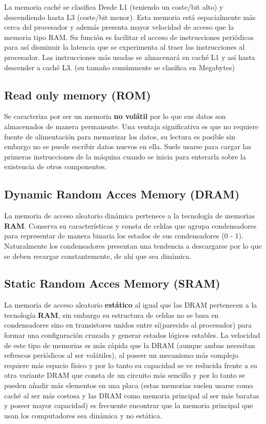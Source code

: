 \documentclass{article}
\begin{document}
La memoria caché se clasifica Desde L1 (teniendo un coste/bit alto) y descendiendo hasta L3 (coste/bit menor). Esta memoria está espacialmente más cerca del procesador y además presenta mayor velocidad de acceso que la memoria tipo RAM. Su función es facilitar el acceso de instrucciones 
 periódicas 
 para así disminuir la latencia que se experimenta al traer las instrucciones al procesador. Las instrucciones más usadas se almacenará en caché L1 y así hasta descender a caché L3.
(su tamaño comúnmente se clasifica en Megabytes)


\subsection{Read only memory (ROM)}
Se caracteriza por ser un memoria \textbf
{no volátil} por lo que sus datos son almacenados de manera permanente. Una ventaja significativa es que no requiere fuente de alimentación para memorizar los datos, su lectura es posible sin embargo no se puede escribir datos nuevos en ella. Suele usarse para cargar las primeras instrucciones de la máquina cuando se inicia para enterarla sobre la existencia de otros componentes.


\subsection{Dynamic Random Acces Memory (DRAM)}
La memoria de acceso aleatorio dinámica pertenece a la tecnología de memorias \textbf{RAM}. Conserva su características y consta de celdas que agrupa condensadores para representar de manera binaria los estados de sus condensadores (0 - 1). Naturalmente los condensadores presentan una tendencia a descargarse por lo que se deben recargar constantemente, de ahí que sea dinámica.

\subsection{Static Random Acces Memory (SRAM)}
La memoria de acceso aleatorio \textbf
{estático} al igual que las DRAM pertenecen a la tecnología \textbf
{RAM}, sin embargo su estructura de celdas no se basa en condensadores sino en transistores unidos entre sí(parecido al procesador) para formar una configuración cruzada y generar estados lógicos estables. La velocidad de este tipo de memorias es más rápida que la DRAM (aunque ambas necesitan refrescos periódicos al ser volátiles), al poseer un mecanismo más complejo requiere más espacio físico y por lo tanto su capacidad se ve reducida frente a su otra variante DRAM que consta de un circuito más sencillo y por lo tanto se pueden añadir más elementos en una placa
(estas memorias suelen usarse como caché al ser más costosa y las DRAM como memoria principal al ser más baratas y poseer mayor capacidad) es frecuente encontrar que la memoria principal que usan los computadores sea dinámica y no estática.
\end{document}
